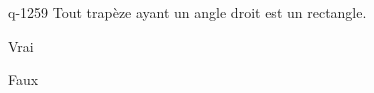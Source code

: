 \begin{truefalse}{q-1259}
Tout trapèze ayant un angle droit est un rectangle.
\item Vrai
\item* Faux
\end{truefalse}

